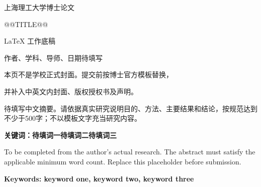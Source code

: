 \documentclass[UTF8,12pt,twoside,openany,fontset=none]{ctexbook}
\makeatletter
\newcommand{\thesistitle}{@@TITLE@@}
\makeatother
\begin{document}
\hypersetup{pageanchor=false}
\begin{titlepage}
  \centering
  \vspace*{2cm}
  {\heiti\fontsize{18bp}{24bp}\selectfont 上海理工大学博士论文\par}
  \vspace{1cm}
  {\heiti\fontsize{18bp}{24bp}\selectfont \thesistitle\par}
  \vspace{2cm}
  LaTeX 工作底稿\par
  作者、学科、导师、日期待填写\par
  \vfill
  本页不是学校正式封面。提交前按博士官方模板替换，\par
  并补入中英文内封面、版权授权书及声明。\par
\end{titlepage}

\frontmatter
\hypersetup{pageanchor=true}
待填写中文摘要。请依据真实研究说明目的、方法、主要结果和结论，按规范达到不少于500字；不以模板文字充当研究内容。
\par\vspace{12bp}
{\fontsize{14bp}{20bp}\selectfont\bfseries\noindent 关键词：待填词一\quad 待填词二\quad 待填词三\par}

To be completed from the author's actual research. The abstract must satisfy the applicable minimum word count. Replace this placeholder before submission.
\par\vspace{12bp}
{\fontsize{14bp}{20bp}\selectfont\bfseries\noindent Keywords: keyword one, keyword two, keyword three\par}

\tableofcontents
\mainmatter


\end{document}
